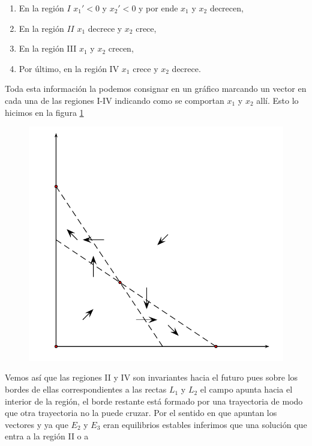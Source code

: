 \begin{enumerate}
    \item  En la región $I$ $x_1'<0$ y $x_2'<0$ y por ende $x_1$ y
    $x_2$ decrecen,
    \item En la región $II$  $x_1$ decrece y
    $x_2$ crece,
    \item En la región III $x_1$ y $x_2$ crecen,
    \item Por último, en la región IV $x_1$ crece y $x_2$ decrece.
\end{enumerate}
Toda esta información la podemos consignar en un gráfico marcando
un vector en cada una de las regiones I-IV indicando como se
comportan $x_1$ y $x_2$ allí. Esto lo hicimos en la figura
\ref{modbioisoclinas}
\begin{figure}[h]
\begin{center}
\includegraphics[scale=.4]{imagenes/EspCompII.png}
\end{center}
\caption{}\label{modbioisoclinas}
\end{figure}
Vemos así que las regiones II y IV son  invariantes hacia el
futuro pues sobre los bordes de ellas correspondientes a las
rectas $L_1$ y $L_2$ el campo apunta hacia el interior de la
región, el borde restante está formado por una trayectoria de modo
que otra trayectoria no la puede cruzar. Por el sentido en que
apuntan los vectores y ya que $E_2$ y $E_3$ eran equilibrios
estables  inferimos que una solución que entra a la región II o a
